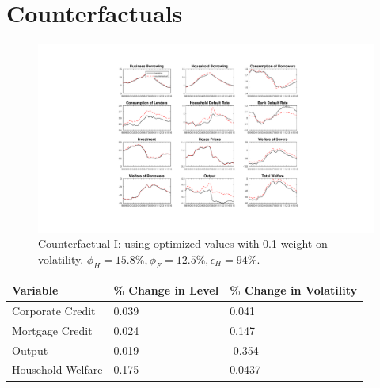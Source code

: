 \documentclass[12pt]{article}
\numberwithin{equation}{section}
\begin{document}



\newpage

\section*{Counterfactuals}


\begin{figure}[H]
\centering
\caption{Counterfactual I: using optimized values  with 0.1 weight on volatility. $\phi_H=15.8 \%, \phi_F=12.5 \%, \epsilon_H=94 \%$.}
\includegraphics[scale=0.45]{counterfactuals2.pdf}
\end{figure}

\begin{table}[h]

\begin{tabular}{l|l|l}
Variable & \% Change in Level & \% Change in Volatility \\
\hline
\hline
    Corporate Credit           &       0.039    &      0.041 \\
    Mortgage Credit            &      0.024    &       0.147 \\
    Output         &     0.019    &    -0.354 \\ 
    Household Welfare       &     0.175     &     0.0437\\
\end{tabular}
\end{table}
\end{document}

